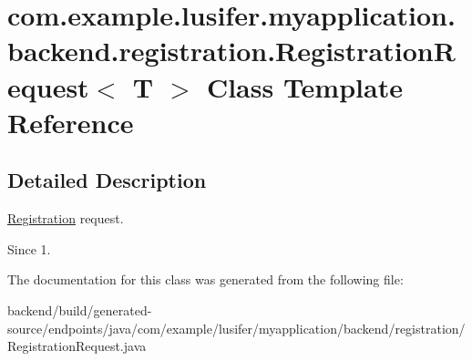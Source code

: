 \hypertarget{classcom_1_1example_1_1lusifer_1_1myapplication_1_1backend_1_1registration_1_1_registration_request}{}\section{com.\+example.\+lusifer.\+myapplication.\+backend.\+registration.\+Registration\+Request$<$ T $>$ Class Template Reference}
\label{classcom_1_1example_1_1lusifer_1_1myapplication_1_1backend_1_1registration_1_1_registration_request}


\subsection{Detailed Description}
\hyperlink{classcom_1_1example_1_1lusifer_1_1myapplication_1_1backend_1_1registration_1_1_registration}{Registration} request.

\begin{DoxySince}{Since}
1. 
\end{DoxySince}


The documentation for this class was generated from the following file\+:\begin{DoxyCompactItemize}
\item 
backend/build/generated-\/source/endpoints/java/com/example/lusifer/myapplication/backend/registration/Registration\+Request.\+java\end{DoxyCompactItemize}
